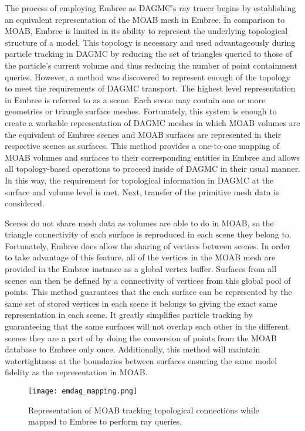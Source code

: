 The process of employing Embree as DAGMC's ray tracer begins by establishing an
equivalent representation of the MOAB mesh in Embree. In comparison to MOAB,
Embree is limited in its ability to represent the underlying topological
structure of a model. This topology is necessary and used advantageously during
particle tracking in DAGMC by reducing the set of triangles queried to those of
the particle's current volume and thus reducing the number of point containment
queries. However, a method was discovered to represent enough of the topology to
meet the requirements of DAGMC transport. The highest level representation in
Embree is referred to as a scene. Each scene may contain one or more geometries
or triangle surface meshes. Fortunately, this system is enough to create a
workable representation of DAGMC meshes in which MOAB volumes are the equivalent
of Embree scenes and MOAB surfaces are represented in their respective scenes as
surfaces. This method provides a one-to-one mapping of MOAB volumes and surfaces
to their corresponding entities in Embree and allows all topology-based
operations to proceed inside of DAGMC in their usual manner. In this way, the
requirement for topological information in DAGMC at the surface and volume level
is met. Next, transfer of the primitive mesh data is considered.

Scenes do not share mesh data as volumes are able to do in MOAB, so the triangle
connectivity of each surface is reproduced in each scene they belong
to. Fortunately, Embree does allow the sharing of vertices between scenes. In
order to take advantage of this feature, all of the vertices in the MOAB mesh
are provided in the Embree instance as a global vertex buffer. Surfaces from all
scenes can then be defined by a connectivity of vertices from this global pool
of points. This method guarantees that the each surface can be represented by
the same set of stored vertices in each scene it belongs to giving the exact
same representation in each scene. It greatly simplifies particle tracking by
guaranteeing that the same surfaces will not overlap each other in the different
scenes they are a part of by doing the conversion of points from the MOAB
database to Embree only once. Additionally, this method will maintain
watertightness at the boundaries between surfaces ensuring the same model
fidelity as the representation in MOAB.

\begin{figure}
  \centering
  \texttt{[image: emdag\_mapping.png]}
  \caption{Representation of MOAB tracking topological connections while mapped to Embree to perform ray queries.}
  \label{emdag_mapping}
\end{figure}

